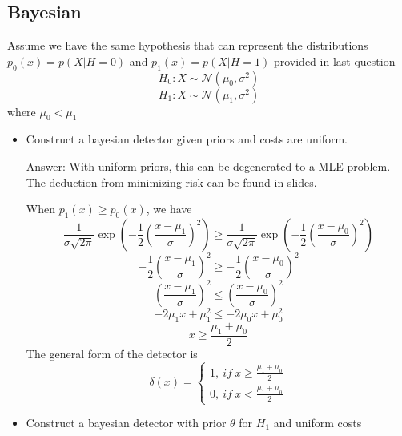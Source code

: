 \documentclass{article}
\newenvironment{answer}{\par\begingroup\color{answer}Answer: }{\endgroup}
\begin{document}
\subsection{Bayesian}
Assume we have the same hypothesis that can represent the distributions $p_0(x) = p(X|H=0)$ and $p_1(x) = p(X|H=1)$ provided in last question
\[
H_0: X \sim \mathcal{N}(\mu_0, \sigma^2)
\]
\[
H_1: X \sim \mathcal{N}(\mu_1, \sigma^2)
\]
where $\mu_0 < \mu_1$
\begin{itemize}
\item Construct a bayesian detector given priors and costs are uniform.
\begin{answer}
With uniform priors, this can be degenerated to a MLE problem. The deduction from minimizing risk can be found in slides.

When $p_1(x) \geq p_0(x)$, we have 
\[
\frac{1}{\sigma\sqrt{2\pi}} \exp(-\frac12 (\frac{x -\mu_1}{\sigma})^2) \geq
\frac{1}{\sigma\sqrt{2\pi}} \exp(-\frac12 (\frac{x -\mu_0}{\sigma})^2)
\]
\[
-\frac12 (\frac{x -\mu_1}{\sigma})^2 \geq
-\frac12 (\frac{x -\mu_0}{\sigma})^2
\]
\[
(\frac{x -\mu_1}{\sigma})^2 \leq
(\frac{x -\mu_0}{\sigma})^2
\]
\[
- 2\mu_1x + \mu_1^2 \leq - 2\mu_0x + \mu_0^2
\]
\[
x \geq \frac{\mu_1 + \mu_0}{2}
\]
The general form of the detector is 
\[
  \delta(x) = 
\begin{cases}
  1,~if~x \geq \frac{\mu_1 + \mu_0}{2}\\
  0,~if~x < \frac{\mu_1 + \mu_0}{2}
\end{cases}
\]
\end{answer}

\item Construct a bayesian detector with prior $\theta$ for $H_1$ and uniform costs


\end{itemize}
\end{document}
